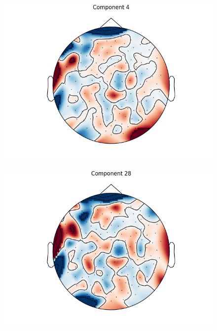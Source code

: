 \documentclass[fleqn,10pt]{wlscirep}
\begin{document}
\begin{figure}[h!]
  \begin{minipage}{0.31\textwidth}
    \centering\includegraphics[width=\linewidth]{max_act/4.png}
     \subcaption{}
    \label{fig:component_4}
  \end{minipage}
  \hspace*{\fill} %
  \begin{minipage}{0.31\textwidth}
    \includegraphics[width=\linewidth]{max_act/28.png}
     \subcaption{}
    \label{fig:component_28}
  \end{minipage}
   \hspace*{\fill} %
   \begin{minipage}{0.31\textwidth}

\end{minipage}
\end{figure}
\end{document}
